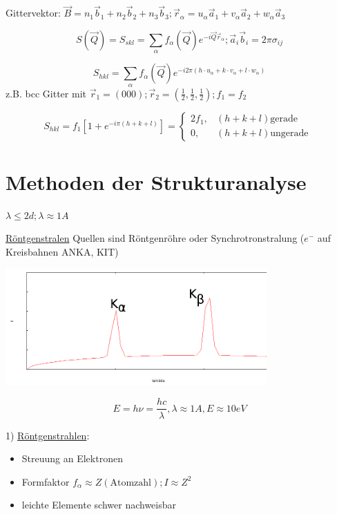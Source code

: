 Gittervektor: \( \vec B = n_1 \vec b_1 +  n_2 \vec b_2 + n_3 \vec b_3;
\vec r_\alpha = u_\alpha\vec a_1 + v_\alpha\vec a_2 +w_\alpha\vec a_3\)

\[ S(\vec Q) = S_{skl} = \sum_\alpha f_\alpha(\vec Q)
e^{-i\vec Q\vec r_\alpha}; \vec a_i\vec b_i=2\pi \sigma_{ij}
\]


\[  S_{hkl} = \sum_\alpha f_\alpha(\vec Q) e^{-i2\pi( h\cdot u_\alpha
  + k\cdot v_\alpha +l\cdot w_\alpha)}\]
z.B. bcc Gitter mit \(\vec r_1 = (000); \vec r_2 = (\frac 1 2, \frac 1
2, \frac 1 2); f_1=f_2\)

\[  S_{hkl} =f_1\left[1 + e^{-i\pi( h + k +l)}\right]=\begin{cases}
  2f_1,  & (h+k+l) \text{gerade } \\
  0, & (h+k+l) \text{ungerade }
\end{cases}
\]

\section{Methoden der Strukturanalyse}

\(\lambda \leq 2d; \lambda \approx 1A\)

\underline{Röntgenstralen} Quellen sind Röntgenröhre oder
Synchrotronstralung (\(e^-\) auf Kreisbahnen ANKA, KIT)



\includegraphics[width=0.75\textwidth]{kap03_05.png}



\[ E = h\nu = \frac {hc}{\lambda}, \lambda \approx 1 A, E\approx
10eV\]

1) \underline{Röntgenstrahlen}:

\begin{itemize}
\item Streuung an Elektronen
\item Formfaktor \(f_\alpha \approx Z (\text{Atomzahl}); I\approx Z^2\)
\item leichte Elemente schwer nachweisbar
\end{itemize}

